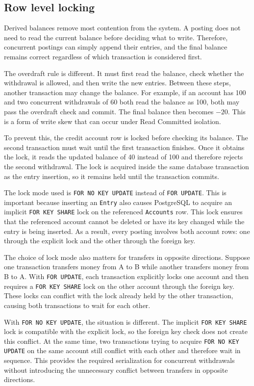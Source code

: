 \documentclass[11pt,a4paper]{article}
\newcommand{\code}[1]{\texttt{\fontsize{8.6}{10}\selectfont #1}}
\begin{document}
\subsection{Row level locking}\label{sec:lock}

Derived balances remove most contention from the system. A posting does not need to read the current balance before deciding what to write. Therefore, concurrent postings can simply append their entries, and the final balance remains correct regardless of which transaction is considered first.

The overdraft rule is different. It must first read the balance, check whether the withdrawal is allowed, and then write the new entries. Between these steps, another transaction may change the balance. For example, if an account has 100 and two concurrent withdrawals of 60 both read the balance as 100, both may pass the overdraft check and commit. The final balance then becomes $-20$. This is a form of write skew that can occur under Read Committed isolation.

To prevent this, the credit account row is locked before checking its balance. The second transaction must wait until the first transaction finishes. Once it obtains the lock, it reads the updated balance of 40 instead of 100 and therefore rejects the second withdrawal. The lock is acquired inside the same database transaction as the entry insertion, so it remains held until the transaction commits.

The lock mode used is \code{FOR NO KEY UPDATE} instead of \code{FOR UPDATE}. This is important because inserting an \code{Entry} also causes PostgreSQL to acquire an implicit \code{FOR KEY SHARE} lock on the referenced \code{Accounts} row. This lock ensures that the referenced account cannot be deleted or have its key changed while the entry is being inserted. As a result, every posting involves both account rows: one through the explicit lock and the other through the foreign key.

The choice of lock mode also matters for transfers in opposite directions. Suppose one transaction transfers money from A to B while another transfers money from B to A. With \code{FOR UPDATE}, each transaction explicitly locks one account and then requires a \code{FOR KEY SHARE} lock on the other account through the foreign key. These locks can conflict with the lock already held by the other transaction, causing both transactions to wait for each other.

With \code{FOR NO KEY UPDATE}, the situation is different. The implicit \code{FOR KEY SHARE} lock is compatible with the explicit lock, so the foreign key check does not create this conflict. At the same time, two transactions trying to acquire \code{FOR NO KEY UPDATE} on the same account still conflict with each other and therefore wait in sequence. This provides the required serialization for concurrent withdrawals without introducing the unnecessary conflict between transfers in opposite directions.
\end{document}
